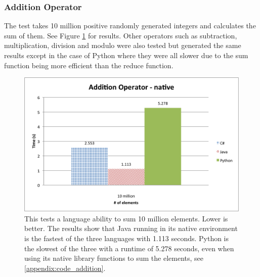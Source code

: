 \subsubsection{Addition Operator}

The test takes 10 million positive randomly generated integers and calculates the sum of them. See Figure \ref{fig:native_addition} for results. Other operators such as subtraction, multiplication, division and modulo were also tested but generated the same results except in the case of Python where they were all slower due to the sum function being more efficient than the reduce function.

\begin{figure}[h]
	\centering
	\includegraphics[width=0.7\linewidth]{chapters/new_media/AdditionOperatorNative.png}
	\caption{This tests a language ability to sum 10 million elements. Lower is better. The results show that Java running in its native environment is the fastest of the three languages with 1.113 seconds. Python is the slowest of the three with a runtime of 5.278 seconds, even when using its native library functions to sum the elements, see \ref{appendix:code_addition}.}
	\label{fig:native_addition}
\end{figure}
